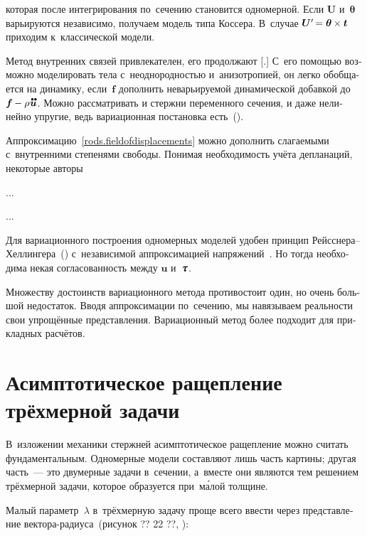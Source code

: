 \begin{otherlanguage}{russian}
\vspace{-0.1em} \noindent которая после интегрирования по~сечению становится одномерной. Если $\bm{U}$ и~$\bm{\theta}$ варьируются независимо, получаем модель типа Коссера. В~случае $\bm{U}' \hspace{-0.25ex} = \bm{\theta} \hspace{-0.1ex} \times \bm{t}$ приходим к~классической модели.

Метод внутренних связей привлекателен, его продолжают [.] С~его помощью возможно моделировать тела с~неоднородностью и~анизотропией, он легко обобщается на динамику, если~$\bm{f}$ дополнить неварьируемой динамической добавкой до~${\bm{f} \hspace{-0.1ex} - \rho \hspace{.1ex} \mathdotdotabove{\bm{u}}}$. Можно рассматривать и стержни переменного сечения, и даже нелинейно упругие, ведь вариационная постановка есть~().

Аппроксимацию~\eqref{rods.fieldofdisplacements} можно дополнить слагаемыми с~внутренними степенями свободы. Понимая необходимость учёта депланаций, некоторые авторы

...

...



Для вариационного построения одномерных моделей удобен принцип Рейсснера\hbox{--}Хеллингера~() с~независимой аппроксимацией напряжений~\cite{eliseev-models}. Но тогда необходима некая согласованность между $\bm{u}$ и~$\mathboldtau$.

Множеству достоинств вариационного метода противостоит один, но очень большой недостаток. Вводя аппроксимации по~сечению, мы навязываем реальности свои упрощённые представления. Вариационный метод более подходит для прикладных расчётов.

\section{Асимптотическое ращепление трёхмерной задачи}

В~изложении механики стержней асимптотическое ращепление можно считать фундаментальным. Одномерные модели составляют лишь часть картины; другая часть~--- это двумерные задачи в~сечении, а~вместе они являются тем решением трёхмерной задачи, которое образуется при~м\'{а}лой толщине.

Малый параметр~$\lambda$ в~трёхмерную задачу проще всего ввести через представление вектора\hbox{-}радиуса~(рисунок ?? 22 ??, ):


\end{otherlanguage}
